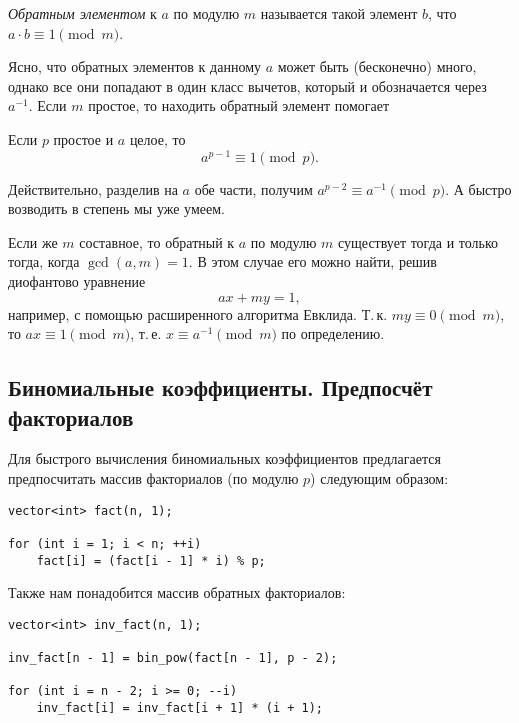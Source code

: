 \begin{definition}
    \textit{Обратным элементом} к $a$ по модулю $m$ называется такой элемент $b$, что $a \cdot b \equiv 1 \pmod m$.
\end{definition}

Ясно, что обратных элементов к данному $a$ может быть (бесконечно) много, однако все они попадают в один класс вычетов, который и обозначается через $a^{-1}$. Если $m$ простое, то находить обратный элемент помогает

\begin{theorem}
    Если $p$ простое и $a$ целое, то \[a^{p - 1} \equiv 1 \pmod p.\]
\end{theorem}

Действительно, разделив на $a$ обе части, получим $a^{p - 2} \equiv a^{-1} \pmod p$. А быстро возводить в степень мы уже умеем.

Если же $m$ составное, то обратный к $a$ по модулю $m$ существует тогда и только тогда, когда $\gcd(a, m) = 1$. В этом случае его можно найти, решив диофантово уравнение
\[
    ax + my = 1,
\]
например, с помощью расширенного алгоритма Евклида. Т.\,к. $my \equiv 0 \pmod m$, то $ax \equiv 1 \pmod m$, т.\,е. $x \equiv a^{-1} \pmod m$ по определению.

\subsection{Биномиальные коэффициенты. Предпосчёт факториалов}

Для быстрого вычисления биномиальных коэффициентов предлагается предпосчитать массив факториалов (по модулю $p$) следующим образом:

\begin{verbatim}
vector<int> fact(n, 1);

for (int i = 1; i < n; ++i)
    fact[i] = (fact[i - 1] * i) % p;
\end{verbatim}

\noindent
Также нам понадобится массив обратных факториалов:

\begin{verbatim}
vector<int> inv_fact(n, 1);

inv_fact[n - 1] = bin_pow(fact[n - 1], p - 2);

for (int i = n - 2; i >= 0; --i)
    inv_fact[i] = inv_fact[i + 1] * (i + 1);
\end{verbatim}


